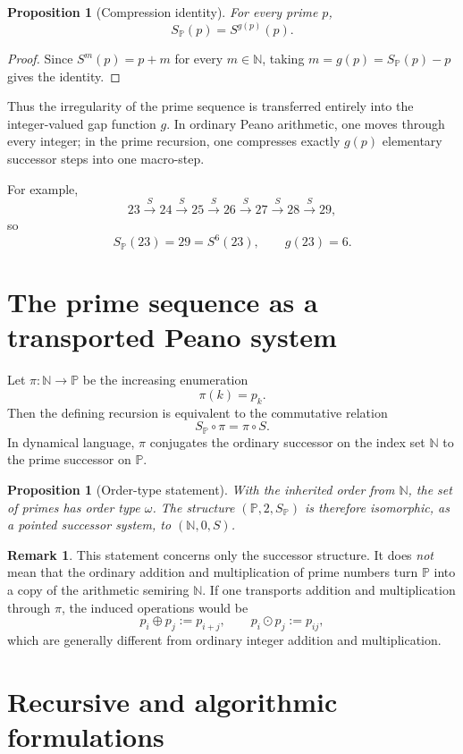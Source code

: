 \documentclass[11pt]{article}
\newtheorem{proposition}[theorem]{Proposition}
\theoremstyle{definition}
\newtheorem{remark}[theorem]{Remark}
\newcommand{\N}{\mathbb{N}}
\newcommand{\Pp}{\mathbb{P}}
\newcommand{\SP}{S_{\!\Pp}}
\newcommand{\gap}{g}
\begin{document}
\begin{proposition}[Compression identity]
For every prime $p$,
\[
\boxed{\SP(p)=S^{\gap(p)}(p).}
\]
\end{proposition}

\begin{proof}
Since $S^m(p)=p+m$ for every $m\in\N$, taking $m=\gap(p)=\SP(p)-p$ gives the identity.
\end{proof}

Thus the irregularity of the prime sequence is transferred entirely into the integer-valued gap function $\gap$. In ordinary Peano arithmetic, one moves through every integer; in the prime recursion, one compresses exactly $\gap(p)$ elementary successor steps into one macro-step.

For example,
\[
23\xrightarrow{S}24\xrightarrow{S}25\xrightarrow{S}26\xrightarrow{S}27\xrightarrow{S}28\xrightarrow{S}29,
\]
so
\[
\SP(23)=29=S^6(23),\qquad \gap(23)=6.
\]

\section{The prime sequence as a transported Peano system}

Let $\pi:\N\to\Pp$ be the increasing enumeration
\[
\pi(k)=p_k.
\]
Then the defining recursion is equivalent to the commutative relation
\[
\boxed{\SP\circ\pi=\pi\circ S.}
\]
In dynamical language, $\pi$ conjugates the ordinary successor on the index set $\N$ to the prime successor on $\Pp$.

\begin{proposition}[Order-type statement]
With the inherited order from $\N$, the set of primes has order type $\omega$. The structure $(\Pp,2,\SP)$ is therefore isomorphic, as a pointed successor system, to $(\N,0,S)$.
\end{proposition}

\begin{remark}
This statement concerns only the successor structure. It does \emph{not} mean that the ordinary addition and multiplication of prime numbers turn $\Pp$ into a copy of the arithmetic semiring $\N$. If one transports addition and multiplication through $\pi$, the induced operations would be
\[
p_i\oplus p_j:=p_{i+j},\qquad p_i\odot p_j:=p_{ij},
\]
which are generally different from ordinary integer addition and multiplication.
\end{remark}

\section{Recursive and algorithmic formulations}
\end{document}
